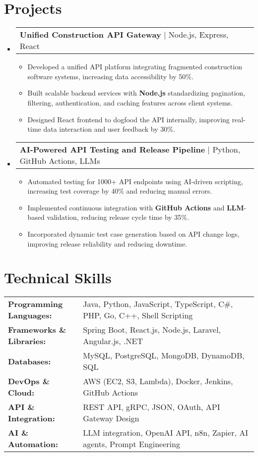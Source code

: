 \documentclass[letterpaper,11pt]{article}
\makeatletter
\newcommand{\resumeItem}[1]{
  \item\footnotesize{
    {#1 \vspace{-2pt}}
  }
}
\newcommand{\resumeProjectHeading}[2]{
    \item
    \begin{tabular*}{1.001\textwidth}{l@{\extracolsep{\fill}}r}
      \small#1 & \textbf{\small #2}\\
    \end{tabular*}\vspace{-7pt}
}
\newcommand{\resumeSubHeadingListStart}{\begin{itemize}[leftmargin=0pt, label={}]}
\newcommand{\resumeSubHeadingListEnd}{\end{itemize}}
\newcommand{\resumeItemListStart}{\begin{itemize}[leftmargin=*]}
\newcommand{\resumeItemListEnd}{\end{itemize}\vspace{-5pt}}
\makeatother
\begin{document}
\section{Projects}
    \vspace{-5pt}
    \resumeSubHeadingListStart
      \resumeProjectHeading
          {\textbf{Unified Construction API Gateway} | Node.js, Express, React}{}
          \resumeItemListStart
              \resumeItem{Developed a unified API platform integrating fragmented construction software systems, increasing data accessibility by 50\%.}
              \resumeItem{Built scalable backend services with \textbf{Node.js} standardizing pagination, filtering, authentication, and caching features across client systems.}
              \resumeItem{Designed React frontend to dogfood the API internally, improving real-time data interaction and user feedback by 30\%.}
          \resumeItemListEnd
          \vspace{-16pt}
      \resumeProjectHeading
          {\textbf{AI-Powered API Testing and Release Pipeline} | Python, GitHub Actions, LLMs}{}
          \resumeItemListStart
              \resumeItem{Automated testing for 1000+ API endpoints using AI-driven scripting, increasing test coverage by 40\% and reducing manual errors.}
              \resumeItem{Implemented continuous integration with \textbf{GitHub Actions} and \textbf{LLM}-based validation, reducing release cycle time by 35\%.}
              \resumeItem{Incorporated dynamic test case generation based on API change logs, improving release reliability and reducing downtime.}
          \resumeItemListEnd 
    \resumeSubHeadingListEnd
\vspace{-10pt}
\section{Technical Skills}
        \vspace{-14pt}
        \begin{table}[h]
            \footnotesize
            \begin{tabular}{p{0.3\linewidth} p{0.7\linewidth}}
                \textbf{Programming Languages:} & Java, Python, JavaScript, TypeScript, C\#, PHP, Go, C++, Shell Scripting \\
                \textbf{Frameworks \& Libraries:} & Spring Boot, React.js, Node.js, Laravel, Angular.js, .NET \\
                \textbf{Databases:} & MySQL, PostgreSQL, MongoDB, DynamoDB, SQL \\
                \textbf{DevOps \& Cloud:} & AWS (EC2, S3, Lambda), Docker, Jenkins, GitHub Actions \\
                \textbf{API \& Integration:} & REST API, gRPC, JSON, OAuth, API Gateway Design \\
                \textbf{AI \& Automation:} & LLM integration, OpenAI API, n8n, Zapier, AI agents, Prompt Engineering \\
            \end{tabular}
        \end{table}
\end{document}
